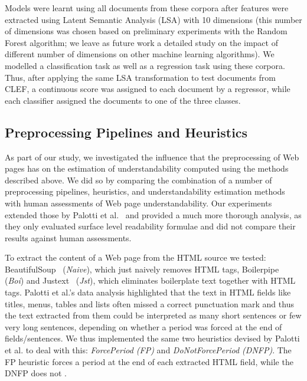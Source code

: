 \documentclass[10pt,a4paper]{article}
\begin{document}
Models were learnt using all documents from these corpora after features were extracted using Latent Semantic Analysis (LSA) with 10 dimensions (this number of dimensions was chosen based on preliminary experiments with the Random Forest algorithm; we leave as future work a detailed study on the impact of different number of dimensions on other machine learning algorithms). We modelled a classification task as well as a regression task using these corpora. Thus, after applying the same LSA transformation to test documents from CLEF, a continuous score was assigned to each document by a regressor, while each classifier assigned the documents to one of the three classes. 


\subsection*{Preprocessing Pipelines and Heuristics}
\label{sec:pipelines}

As part of our study, we investigated the influence that the preprocessing of Web pages has on the estimation of understandability computed using the methods described above.
We did so by comparing the combination of a number of preprocessing pipelines, heuristics, and understandability estimation methods with human assessments of Web page understandability. 
Our experiments extended those by Palotti et al.~\cite{palotti15} and provided a much more thorough analysis, as they only evaluated surface level readability formulae and did not compare their results against human assessments. 

To extract the content of a Web page from the HTML source we tested: BeautifulSoup~\cite{bs4} (\textit{Naive}), which just naively removes HTML tags, Boilerpipe~\cite{kohlschutter10} (\textit{Boi}) and Justext~\cite{jan11} (\textit{Jst}), which eliminates boilerplate text together with HTML tags. 
Palotti et al.'s data analysis highlighted that the text in HTML fields like titles, menus, tables and lists often missed a correct punctuation mark and thus the text extracted from them could be interpreted as many short sentences or few very long sentences, depending on whether a period was forced at the end of fields/sentences. We thus implemented the same two heuristics devised by Palotti et al. to deal with this: \textit{ForcePeriod (FP)} and \textit{DoNotForcePeriod (DNFP)}. The FP heuristic forces a period at the end of each extracted HTML field, while the DNFP does not . 
\end{document}
